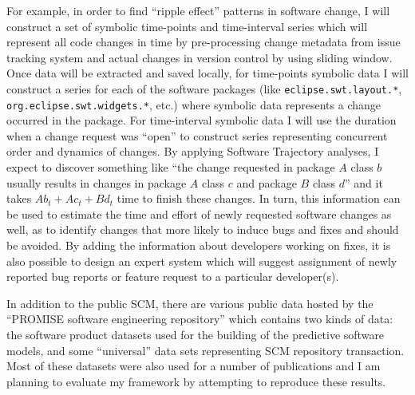 For example, in order to find ``ripple effect'' patterns in software change, I will construct a set of symbolic time-points and time-interval series which will represent all code changes in time by pre-processing change metadata from issue tracking system and actual changes in version control by using sliding window. Once data will be extracted and saved locally, for time-points symbolic data I will construct a series for each of the software packages (like \texttt{eclipse.swt.layout.*}, \texttt{org.eclipse.swt.widgets.*}, etc.) where symbolic data represents a change occurred in the package. For time-interval symbolic data I will use the duration when a change request was ``open'' to construct series representing concurrent order and dynamics of changes. By applying Software Trajectory analyses, I expect to discover something like ``the change requested in package $A$ class $b$ usually results in changes in package $A$ class $c$ and package $B$ class $d$'' and it takes $Ab_{t} + Ac_{t} + Bd_{t}$ time to finish these changes. In turn, this information can be used to estimate the time and effort of newly requested software changes as well, as to identify changes that more likely to induce bugs and fixes and should be avoided. By adding the information about developers working on fixes, it is also possible to design an expert system which will suggest assignment of newly reported bug reports or feature request to a particular developer(s).

In addition to the public SCM, there are various public data hosted by the ``PROMISE software engineering repository'' \cite{Sayyad:2005} which contains two kinds of data: the software product datasets used for the building of the predictive software models, and some ``universal'' data sets representing SCM repository transaction. Most of these datasets were also used for a number of publications and I am planning to evaluate my framework by attempting to reproduce these results. 
